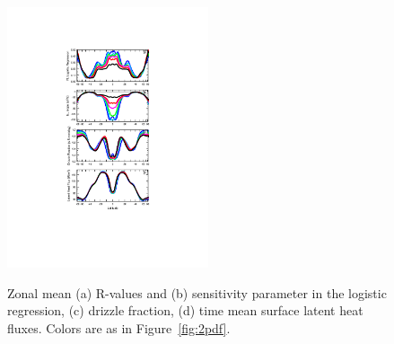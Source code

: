 \begin{figure}[t]
\begin{center}
\noindent\includegraphics[width=14pc,angle=0]{chapter6/temp_zonal_4reg_dwn.pdf}\\
\end{center}
\caption{Zonal mean (a) R-values and (b) sensitivity parameter in the logistic regression, (c) drizzle fraction, (d) time mean surface latent heat fluxes. Colors are as in Figure~\ref{fig:2pdf}.}
\label{fig:4reg}
\end{figure}

